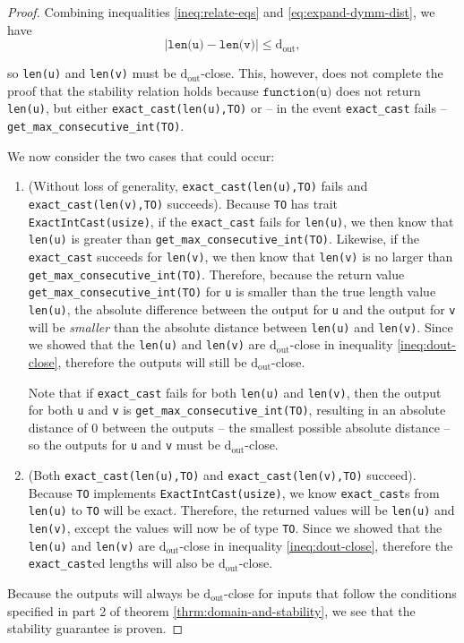 \documentclass[12pt,letterpaper]{article}
\newcommand{\dout}{\mathrm{d_{out}}}
\theoremstyle{definition}
\begin{document}
\begin{proof}
Combining inequalities \ref{ineq:relate-eqs} and \ref{eq:expand-dymm-dist}, we have
\begin{equation}
\label{ineq:dout-close}
    |\texttt{len(u)} - \texttt{len(v)}|
    \leq
    \dout,
\end{equation}

so \texttt{len(u)} and \texttt{len(v)} must be $\dout$-close. This, however, does not complete the proof that the stability relation holds because $\texttt{function(u)}$ does not return \texttt{len(u)}, but either \texttt{exact\_cast(len(u),TO)} or -- in the event \texttt{exact\_cast} fails -- \texttt{get\_max\_consecutive\_int(TO)}.

We now consider the two cases that could occur:

\begin{enumerate}
    \item (Without loss of generality, \texttt{exact\_cast(len(u),TO)} fails and \texttt{exact\_cast(len(v),TO)} succeeds). Because \texttt{TO} has trait \texttt{ExactIntCast(usize)}, if the \texttt{exact\_cast} fails for \texttt{len(u)}, we then know that \texttt{len(u)} is greater than \texttt{get\_max\_consecutive\_int(TO)}. Likewise, if the \texttt{exact\_cast} succeeds for \texttt{len(v)}, we then know that \texttt{len(v)} is no larger than \texttt{get\_max\_consecutive\_int(TO)}. Therefore, because the return value  \texttt{get\_max\_consecutive\_int(TO)} for \texttt{u} is smaller than the true length value \texttt{len(u)}, the absolute difference between the output for \texttt{u} and the output for \texttt{v} will be \emph{smaller} than the absolute distance between \texttt{len(u)} and \texttt{len(v)}. Since we showed that the \texttt{len(u)} and \texttt{len(v)} are $\dout$-close in inequality \ref{ineq:dout-close}, therefore the outputs will still be $\dout$-close.
    
    Note that if \texttt{exact\_cast} fails for both \texttt{len(u)} and \texttt{len(v)}, then the output for both \texttt{u} and \texttt{v} is \texttt{get\_max\_consecutive\_int(TO)}, resulting in an absolute distance of 0 between the outputs -- the smallest possible absolute distance -- so the outputs for \texttt{u} and \texttt{v} must be $\dout$-close.
    
    \item (Both \texttt{exact\_cast(len(u),TO)} and \texttt{exact\_cast(len(v),TO)} succeed). Because \texttt{TO} implements \texttt{ExactIntCast(usize)}, we know \texttt{exact\_cast}s from \texttt{len(u)} to \texttt{TO} will be exact. Therefore, the returned values will be \texttt{len(u)} and \texttt{len(v)}, except the values will now be of type \texttt{TO}. Since we showed that the \texttt{len(u)} and \texttt{len(v)} are $\dout$-close in inequality \ref{ineq:dout-close}, therefore the \texttt{exact\_cast}ed lengths will also be $\dout$-close.
\end{enumerate}

Because the outputs will always be $\dout$-close for inputs that follow the conditions specified in part 2 of theorem \ref{thrm:domain-and-stability}, we see that the stability guarantee is proven.

\end{proof}
\end{document}
